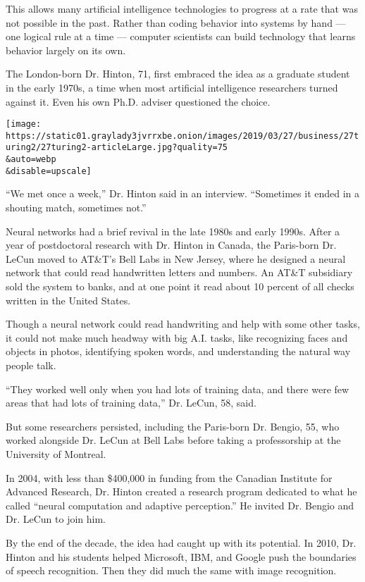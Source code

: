 This allows many artificial intelligence technologies to progress at a
rate that was not possible in the past. Rather than coding behavior into
systems by hand --- one logical rule at a time --- computer scientists
can build technology that learns behavior largely on its own.

The London-born Dr. Hinton, 71, first embraced the idea as a graduate
student in the early 1970s, a time when most artificial intelligence
researchers turned against it. Even his own Ph.D. adviser questioned the
choice.

\texttt{[image: https://static01.graylady3jvrrxbe.onion/images/2019/03/27/business/27turing2/27turing2-articleLarge.jpg?quality=75\\\&auto=webp\\\&disable=upscale]}

``We met once a week,'' Dr. Hinton said in an interview. ``Sometimes it
ended in a shouting match, sometimes not.''

Neural networks had a brief revival in the late 1980s and early 1990s.
After a year of postdoctoral research with Dr. Hinton in Canada, the
Paris-born Dr. LeCun moved to AT\&T's Bell Labs in New Jersey, where he
designed a neural network that could read handwritten letters and
numbers. An AT\&T subsidiary sold the system to banks, and at one point
it read about 10 percent of all checks written in the United States.

Though a neural network could read handwriting and help with some other
tasks, it could not make much headway with big A.I. tasks, like
recognizing faces and objects in photos, identifying spoken words, and
understanding the natural way people talk.

``They worked well only when you had lots of training data, and there
were few areas that had lots of training data,'' Dr. LeCun, 58, said.

But some researchers persisted, including the Paris-born Dr. Bengio, 55,
who worked alongside Dr. LeCun at Bell Labs before taking a
professorship at the University of Montreal.

In 2004, with less than \$400,000 in funding from the Canadian Institute
for Advanced Research, Dr. Hinton created a research program dedicated
to what he called ``neural computation and adaptive perception.'' He
invited Dr. Bengio and Dr. LeCun to join him.

By the end of the decade, the idea had caught up with its potential. In
2010, Dr. Hinton and his students helped Microsoft, IBM, and Google push
the boundaries of speech recognition. Then they did much the same with
image recognition.


